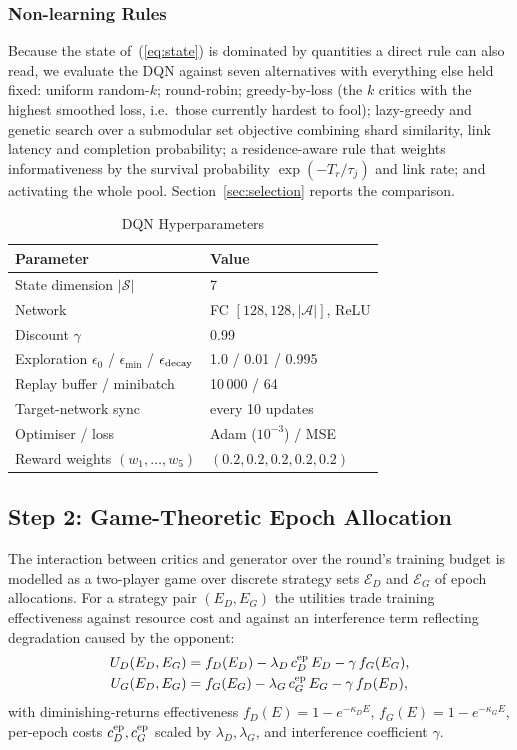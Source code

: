 \documentclass[journal]{IEEEtran}
\begin{document}
\subsubsection{Non-learning Rules}
Because the state of~(\ref{eq:state}) is dominated by quantities a direct rule
can also read, we evaluate the DQN against seven alternatives with everything
else held fixed: uniform random-$k$; round-robin; greedy-by-loss (the $k$
critics with the highest smoothed loss, i.e.\ those currently hardest to fool);
lazy-greedy and genetic search over a submodular set objective combining shard
similarity, link latency and completion probability; a residence-aware rule
that weights informativeness by the survival probability $\exp(-T_r/\tau_j)$
and link rate; and activating the whole pool. Section~\ref{sec:selection}
reports the comparison.

\begin{table}[!t]
\centering
\caption{DQN Hyperparameters}
\label{tab:dqn}
\footnotesize
\begin{tabular}{ll}
\toprule
Parameter & Value \\
\midrule
State dimension $|\mathcal{S}|$ & 7 \\
Network & FC $[128,128,|\mathcal{A}|]$, ReLU \\
Discount $\gamma$ & 0.99 \\
Exploration $\epsilon_0$ / $\epsilon_{\min}$ / $\epsilon_{\rm decay}$ & 1.0 / 0.01 / 0.995 \\
Replay buffer / minibatch & 10\,000 / 64 \\
Target-network sync & every 10 updates \\
Optimiser / loss & Adam ($10^{-3}$) / MSE \\
Reward weights $(w_1,\ldots,w_5)$ & $(0.2,0.2,0.2,0.2,0.2)$ \\
\bottomrule
\end{tabular}
\end{table}

\subsection{Step 2: Game-Theoretic Epoch Allocation}
\label{sec:step2}
The interaction between critics and generator over the round's training budget
is modelled as a two-player game over discrete strategy sets $\mathcal{E}_D$
and $\mathcal{E}_G$ of epoch allocations. For a strategy pair $(E_D,E_G)$ the
utilities trade training effectiveness against resource cost and against an
interference term reflecting degradation caused by the opponent:
\begin{align}
U_D(E_D,E_G)&=f_D(E_D)-\lambda_D\,c^{\rm ep}_D\,E_D-\gamma\,f_G(E_G),
\label{eq:utilD}\\
U_G(E_D,E_G)&=f_G(E_G)-\lambda_G\,c^{\rm ep}_G\,E_G-\gamma\,f_D(E_D),
\label{eq:utilG}
\end{align}
with diminishing-returns effectiveness
$f_D(E)=1-e^{-\kappa_DE}$, $f_G(E)=1-e^{-\kappa_GE}$,
per-epoch costs $c^{\rm ep}_D,c^{\rm ep}_G$ scaled by $\lambda_D,\lambda_G$,
and interference coefficient $\gamma$.
\end{document}
